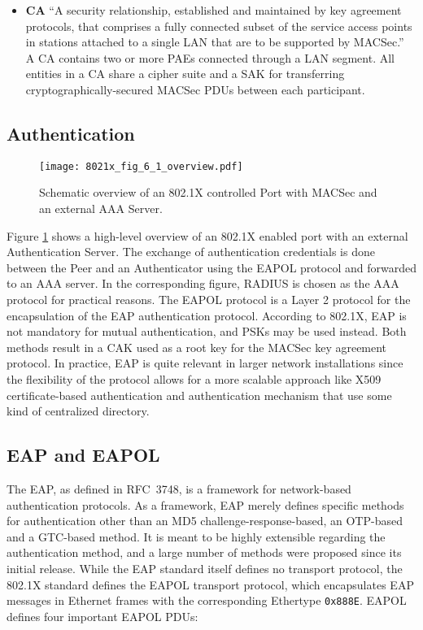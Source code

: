 \begin{itemize}
    \item \textbf{\ac{CA}} ``A security relationship, established and maintained by key agreement protocols, that comprises a fully connected subset of the service access points in stations attached to a single LAN that are to be supported by MACSec.'' \\
    A \ac{CA} contains two or more \acp{PAE} connected through a LAN segment. All entities in a \ac{CA} share a cipher suite and a \ac{SAK} for transferring cryptographically-secured MACSec \acp{PDU} between each participant.
\end{itemize}

\subsection{Authentication}

\begin{figure}[ht]
    \centering\texttt{[image: 8021x\_fig\_6\_1\_overview.pdf]}
    \caption{Schematic overview of an 802.1X controlled Port with MACSec and an external AAA Server\cite{IEEE8021X}.}\label{fig:8021x_fig_6_1_overview}
\end{figure}

Figure \ref{fig:8021x_fig_6_1_overview} shows a high-level overview of an 802.1X enabled port with an external Authentication Server. The exchange of authentication credentials is done between the Peer and an Authenticator using the \ac{EAPOL} protocol and forwarded to an \ac{AAA} server. In the corresponding figure, RADIUS is chosen as the AAA protocol for practical reasons. The \ac{EAPOL} protocol is a Layer 2 protocol for the encapsulation of the \ac{EAP} authentication protocol. According to 802.1X, \ac{EAP} is not mandatory for mutual authentication, and \acp{PSK} may be used instead. Both methods result in a \ac{CAK} used as a root key for the MACSec key agreement protocol. In practice, \ac{EAP} is quite relevant in larger network installations since the flexibility of the protocol allows for a more scalable approach like X509 certificate-based authentication and authentication mechanism that use some kind of centralized directory.

\subsection{EAP and EAPOL}
The \acl{EAP}, as defined in RFC~3748\cite{rfc3748}, is a framework for network-based authentication protocols. As a framework, \ac{EAP} merely defines specific methods for authentication other than an MD5 challenge-response-based, an \ac{OTP}-based and a \ac{GTC}-based method. It is meant to be highly extensible regarding the authentication method, and a large number of methods were proposed since its initial release. While the \ac{EAP} standard itself defines no transport protocol, the 802.1X standard defines the \ac{EAPOL} transport protocol, which encapsulates \ac{EAP} messages in Ethernet frames with the corresponding Ethertype \texttt{0x888E}. \ac{EAPOL} defines four important \ac{EAPOL} \acp{PDU}:

